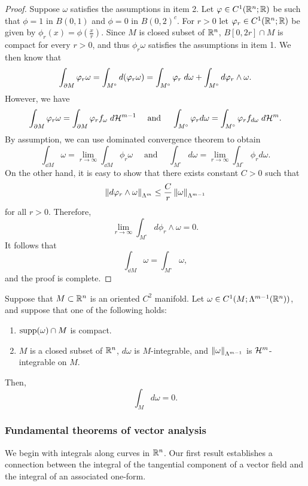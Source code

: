 \documentclass[a4paper]{article}
\begin{document}
\begin{proof}
Suppose $\omega$ satisfies the assumptions in item 2.
Let $\varphi \in C^1 (\mathbb{R}^n ; \mathbb{R})$ be such that $\phi = 1$
in $B(0,1)$ and $\phi = 0$ in $B(0, 2)^c$. For $r > 0$
let $\varphi_r \in C^1 (\mathbb{R}^n ; \mathbb{R})$ be given by
$\phi_r (x) = \phi(\frac{x}{r})$. Since $M$ is closed subset
of $\mathbb{R}^n$, $B[0, 2r] \cap M$ is compact for every $r > 0$,
and thus $\phi_r \omega$ satisfies the assumptions in item 1.
We then know that
\[
\int_{\partial M} \varphi_r \omega
= \int_{M^\circ} d (\varphi_r \omega)
= \int_{M^\circ} \varphi_r \; d \omega + \int_{M^\circ} d \varphi_r
\wedge \omega.
\]
However, we have
\[
\int_{\partial M} \varphi_r \omega = \int_{\partial M} \varphi_r
f_\omega \; d \mathcal{H}^{m-1}
\quad \text{ and } \quad
\int_{M^\circ} \varphi_r d \omega
= \int_{M^\circ} \varphi_r f_{d \omega} \; d \mathcal{H}^m.
\]
By assumption, we can use dominated convergence theorem
to obtain
\[
\int_{\dd M} \omega = \lim_{r \to \infty}
\int_{\dd M} \phi_r \omega
\quad \text{ and } \quad
\int_{M^\circ} d \omega
= \lim_{r \to \infty} \int_{M^\circ} \phi_r d \omega.
\]
On the other hand, it is easy to show that there exists
constant $C > 0$ such that
\[
\left\lVert d \varphi_r \wedge \omega\right\rVert_{\Lambda^m}
\leq \frac{C}{r} \left\lVert \omega\right\rVert_{\Lambda^{m-1}}
\]
for all $r > 0$. Therefore,
\[
\lim_{r \to \infty} \int_{M^\circ} d \phi_r \wedge \omega
= 0.
\]
It follows that
\[
\int_{\dd M} \omega = \int_{M^\circ} \omega,
\]
and the proof is complete.
\end{proof}

\begin{thm}
Suppose that $M \subset \mathbb{R}^n$ is an oriented $C^2$ manifold.
Let $\omega
\in C^1 (M; \Lambda^{m-1} (\mathbb{R}^n))$, and suppose that one of
the following holds:
\begin{enumerate}
  \item $\operatorname{supp} (\omega) \cap M$ is compact.
  \item $M$ is a closed subset of $\mathbb{R}^n$,
  $d \omega$ is $M$-integrable,
  and $\left\lVert \omega\right\rVert_{\Lambda^{m-1}}$ is $\mathcal{H}^m$-integrable
  on $M$.
\end{enumerate}
Then,
\[
\int_M d \omega = 0.
\]
\end{thm}

\subsubsection{Fundamental theorems of vector analysis}

We begin with integrals along curves in $\mathbb{R}^n$. Our first
result establishes a connection between the integral of the 
tangential component of a vector field and the integral of 
an associated one-form.
\end{document}
